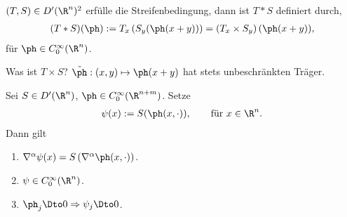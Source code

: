 \begin{defn}
\label{defn:3.34}
$(T,S)\in D'(\R^n)^2$ erfülle die Streifenbedingung, dann ist $T*S$ definiert
durch,
\begin{align*}
(T*S)(\ph) := T_x\left(S_y(\ph(x+y)) \right) = \left(T_x \times
S_y\right)(\ph(x+y)),
\end{align*}
für $\ph\in C_0^\infty(\R^n)$.\fishhere
\end{defn}
\begin{bemn}[Probleme.]
Was ist $T\times S$? $\tilde{\ph}: (x,y)\mapsto \ph(x+y)$ hat stets
unbeschränkten Träger.
\end{bemn}

\begin{lem}
\label{prop:3.35}
Sei $S\in D'(\R^n)$, $\ph\in C_0^\infty(\R^{n+m})$. Setze
\begin{align*}
\psi(x) := S(\ph(x,\cdot)),\qquad\text{für }x\in \R^n. 
\end{align*}
Dann gilt
\begin{enumerate}[label=(\roman{*})]
  \item\label{prop:3.35:1} $\nabla^\alpha\psi(x) = S\left(\nabla^\alpha
  \ph(x,\cdot)\right)$.
  \item $\psi\in C_0^\infty(\R^n)$.
  \item $\ph_j\Dto 0\Rightarrow \psi_j \Dto 0$.
\end{enumerate}
\end{lem}

